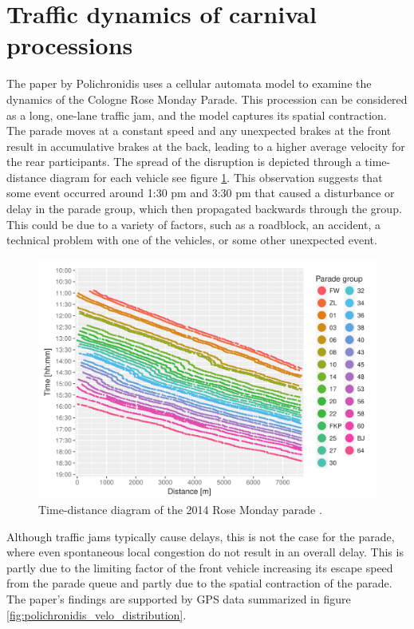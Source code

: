 \section{Traffic dynamics of carnival processions}
\label{sec:Traffic dynamics of carnival processions}
The paper by Polichronidis \cite{Polichronidis_2018} uses a cellular automata model to examine the dynamics of the Cologne Rose Monday Parade. This procession can be considered as a long, one-lane traffic jam, and the model captures its spatial contraction. The parade moves at a constant speed and any unexpected brakes at the front result in accumulative brakes at the back, leading to a higher average velocity for the rear participants. The spread of the disruption is depicted through a time-distance diagram for each vehicle see figure \ref{fig:polichronidis_time_distance}. This observation suggests that some event occurred around 1:30 pm and 3:30 pm that caused a disturbance or delay in the parade group, which then propagated backwards through the group. This could be due to a variety of factors, such as a roadblock, an accident, a technical problem with one of the vehicles, or some other unexpected event.
\begin{figure}
	\centering
    \includegraphics[width=0.8\linewidth]{images/polichronidis_time_distance.png}
    \caption{Time-distance diagram of the 2014 Rose Monday parade \cite{Polichronidis_2018}.}
    \label{fig:polichronidis_time_distance}
\end{figure}
Although traffic jams typically cause delays, this is not the case for the parade, where even spontaneous local congestion do not result in an overall delay. This is partly due to the limiting factor of the front vehicle increasing its escape speed from the parade queue and partly due to the spatial contraction of the parade. The paper's findings are supported by GPS data summarized in figure \ref{fig:polichronidis_velo_distribution}.
